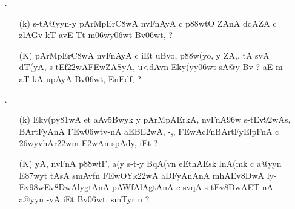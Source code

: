 \begin{itemize}
  \item[{\dn \dnnum \rn{20}}.] \begin{itemize}
             
             \item[({\dn k})] {\dn s\2-tA@yyn-y pArMpEr\3C8wA\2 nvFnAyA\2 c p\388wtO ZAnA\2 d\?qAZA\2 c zlAGv\2 kT avE-Tt\2 m\306wy\306wt\? Bv\306wt, {\rs ?\re}}
             
             \item[({\dn K})] {\dn pArMpEr\3C8wA\2 nvFnAyA\2 c iEt uByo, p\388w(yo, y\? ZA,{\rs ,\re} tA svA\0 dT(yA, s\2-tEf\322wA\3FEwZASyA, u<dAvn\2 Eky(yy\0\306wt\2 sA@y\2 Bv\? {\rs ?\re} aE-m aT\?{\qvb} kA upAyA Bv\306wt, EnEd\0f\?, {\rs ?\re}}
             \end{itemize} 
             
             
 \item[{\dn \dnnum \rn{21}}.]  \begin{itemize}
                
                \item[({\dn k})] {\dn Eky(py\0\381wA et aAv\35Bwyk\2 y pArMpAErkA, nvFnA\396w s\2-tEv\392wA\2s, BArtFyAnA\2 \3FEw\306wtv-nA aEB\3E2wA, -,{\rs ,\re} \3FEwAcFnBArtFyElpFnA\2 c \326wyvhAr\322wm\2 \3E2wAn\2 s\2pAdy\?, iEt {\rs ?\re}}
                
                \item[({\dn K})] {\dn yA, nvFnA\2 p\388wtF, a(y s\2-t-y BqA(v\?n e\?EthAEsk\2 lnA(mk\2 c a@yyn\2 E\387wyt\?{\rs ,\re} tAsA\2 smAv\?fn\2 \3FEwOYk\322wA aDFyAnAnA\2 mhAEv\38DwA\- ly{\rs -\re}Ev\398wEv\38DwAlygtAnA\2 pAWfAlAgtAnA\2 c sv\?{\qvb}qA\2 s\2-tEv\38DwAET\0\- nA a@yyn\? -yA iEt Bv\306wt, smT\0y\?r n {\rs ?\re}}
                \end{itemize}
\end{itemize}
            

